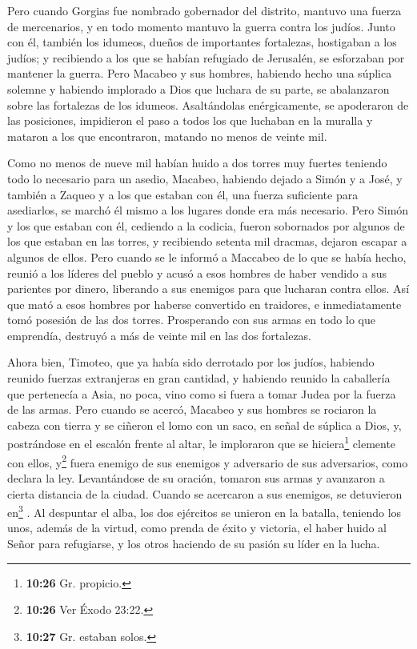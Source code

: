  Pero cuando Gorgias fue nombrado gobernador del
distrito, mantuvo una fuerza de mercenarios, y en todo momento mantuvo
la guerra contra los judíos.  Junto con él, también los
idumeos, dueños de importantes fortalezas, hostigaban a los judíos; y
recibiendo a los que se habían refugiado de Jerusalén, se esforzaban por
mantener la guerra.  Pero Macabeo y sus hombres, habiendo
hecho una súplica solemne y habiendo implorado a Dios que luchara de su
parte, se abalanzaron sobre las fortalezas de los idumeos.
 Asaltándolas enérgicamente, se apoderaron de las
posiciones, impidieron el paso a todos los que luchaban en la muralla y
mataron a los que encontraron, matando no menos de veinte mil.

 Como no menos de nueve mil habían huido a dos torres muy
fuertes teniendo todo lo necesario para un asedio, 
Macabeo, habiendo dejado a Simón y a José, y también a Zaqueo y a los
que estaban con él, una fuerza suficiente para asediarlos, se marchó él
mismo a los lugares donde era más necesario.  Pero Simón
y los que estaban con él, cediendo a la codicia, fueron sobornados por
algunos de los que estaban en las torres, y recibiendo setenta mil
dracmas, dejaron escapar a algunos de ellos.  Pero cuando
se le informó a Maccabeo de lo que se había hecho, reunió a los líderes
del pueblo y acusó a esos hombres de haber vendido a sus parientes por
dinero, liberando a sus enemigos para que lucharan contra ellos.
 Así que mató a esos hombres por haberse convertido en
traidores, e inmediatamente tomó posesión de las dos torres.
 Prosperando con sus armas en todo lo que emprendía,
destruyó a más de veinte mil en las dos fortalezas.

 Ahora bien, Timoteo, que ya había sido derrotado por los
judíos, habiendo reunido fuerzas extranjeras en gran cantidad, y
habiendo reunido la caballería que pertenecía a Asia, no poca, vino como
si fuera a tomar Judea por la fuerza de las armas.  Pero
cuando se acercó, Macabeo y sus hombres se rociaron la cabeza con tierra
y se ciñeron el lomo con un saco, en señal de súplica a Dios,
 y, postrándose en el escalón frente al altar, le
imploraron que se hiciera\footnote{\textbf{10:26} Gr. propicio.}
clemente con ellos, y\footnote{\textbf{10:26} Ver Éxodo 23:22.} fuera
enemigo de sus enemigos y adversario de sus adversarios, como declara la
ley.  Levantándose de su oración, tomaron sus armas y
avanzaron a cierta distancia de la ciudad. Cuando se acercaron a sus
enemigos, se detuvieron en\footnote{\textbf{10:27} Gr. estaban solos.} .
 Al despuntar el alba, los dos ejércitos se unieron en la
batalla, teniendo los unos, además de la virtud, como prenda de éxito y
victoria, el haber huido al Señor para refugiarse, y los otros haciendo
de su pasión su líder en la lucha.


